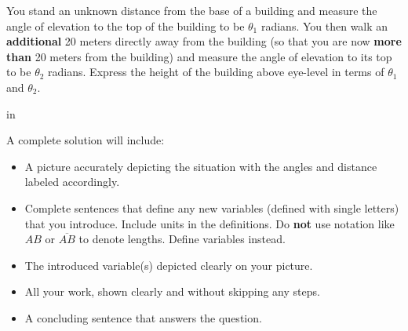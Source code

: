 \documentclass{ximera}
\newcommand{\pskip}{\vskip 0.1 in}
\begin{document}
\begin{question}  \label{Q34ftt4g}
You stand an unknown distance from the base of a building and measure the angle of elevation to the top of the building to be $\theta_1$ radians. You then walk an {\bf additional} 20 meters directly away from the building (so that you are now {\bf more than} 20 meters from the building) and measure the angle of elevation to its top to be $\theta_2$ radians. Express the height of the building above eye-level in terms of $\theta_1$ and $\theta_2$.


\pskip


A complete solution will include:

\begin{itemize}
\item{A picture accurately depicting the situation with the angles and distance labeled accordingly.}

\item{Complete sentences that define any new variables (defined with single letters) that you introduce. Include units in the definitions. Do {\bf not} use notation like $AB$ or $\overline{AB}$ to denote lengths. Define variables instead.}

\item{The introduced variable(s) depicted clearly on your picture.}

\item{All your work, shown clearly and without skipping any steps.}

\item{A concluding sentence that answers the question.}

\end{itemize}

\end{question}
\end{document}
